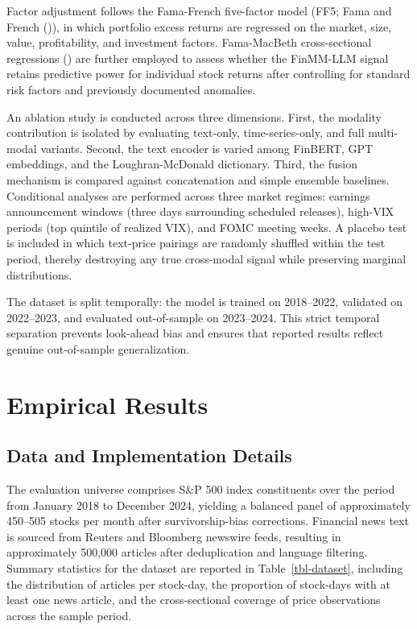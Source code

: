 \documentclass[
  11pt,
  a4paper,
]{article}
\begin{document}
Factor adjustment follows the Fama-French five-factor model (FF5; Fama
and French ()), in which portfolio excess
returns are regressed on the market, size, value, profitability, and
investment factors. Fama-MacBeth cross-sectional regressions
() are further employed to
assess whether the FinMM-LLM signal retains predictive power for
individual stock returns after controlling for standard risk factors and
previously documented anomalies.

An ablation study is conducted across three dimensions. First, the
modality contribution is isolated by evaluating text-only,
time-series-only, and full multi-modal variants. Second, the text
encoder is varied among FinBERT, GPT embeddings, and the
Loughran-McDonald dictionary. Third, the fusion mechanism is compared
against concatenation and simple ensemble baselines. Conditional
analyses are performed across three market regimes: earnings
announcement windows (three days surrounding scheduled releases),
high-VIX periods (top quintile of realized VIX), and FOMC meeting weeks.
A placebo test is included in which text-price pairings are randomly
shuffled within the test period, thereby destroying any true cross-modal
signal while preserving marginal distributions.

The dataset is split temporally: the model is trained on 2018--2022,
validated on 2022--2023, and evaluated out-of-sample on 2023--2024. This
strict temporal separation prevents look-ahead bias and ensures that
reported results reflect genuine out-of-sample generalization.

\section{Empirical Results}\label{empirical-results}

\subsection{Data and Implementation
Details}\label{data-and-implementation-details}

The evaluation universe comprises S\&P 500 index constituents over the
period from January 2018 to December 2024, yielding a balanced panel of
approximately 450--505 stocks per month after survivorship-bias
corrections. Financial news text is sourced from Reuters and Bloomberg
newswire feeds, resulting in approximately 500,000 articles after
deduplication and language filtering. Summary statistics for the dataset
are reported in Table~\ref{tbl-dataset}, including the distribution of
articles per stock-day, the proportion of stock-days with at least one
news article, and the cross-sectional coverage of price observations
across the sample period.
\end{document}
